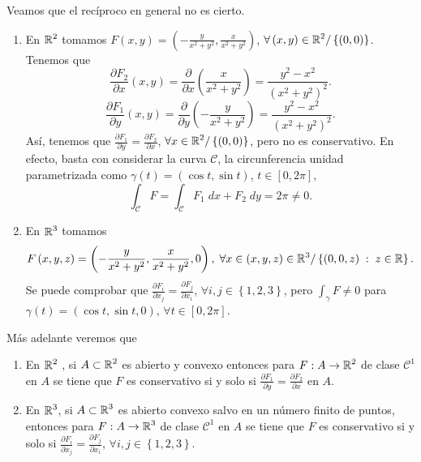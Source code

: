 \begin{eg}
Veamos que el recíproco en general no es cierto.
\begin{enumerate}
	\item En $\displaystyle \mathbb{R}^{2} $ tomamos $\displaystyle F\left(x,y\right)=\left(-\frac{y}{x^{2}+y^{2}}, \frac{x}{x^{2}+y^{2}}\right) $, $\displaystyle \forall \left(x,y\right)\in \mathbb{R}^{2} / \left\{ \left(0,0\right)\right\}  $. Tenemos que 
		\[\frac{\partial F_{2}}{\partial x}\left(x,y\right)=\frac{\partial }{\partial x}\left(\frac{x}{x^{2}+y^{2}}\right)=\frac{y^{2}-x^{2}}{\left(x^{2}+y^{2}\right)^{2}}  .\]
		\[\frac{\partial F_{1}}{\partial y}\left(x,y\right)=
		\frac{\partial }{\partial y}\left(-\frac{y}{x^{2}+y^{2}}\right)=\frac{y^{2}-x^{2}}{\left(x^{2}+y^{2}\right)^{2}} .\]
		Así, tenemos que $\displaystyle \frac{\partial F_{1}}{\partial y}=\frac{\partial F_{2}}{\partial x} $, $\displaystyle \forall x \in \mathbb{R}^{2}/ \left\{ \left(0,0\right)\right\}  $, pero no es conservativo. En efecto, basta con considerar la curva $\displaystyle \mathcal{C} $, la circunferencia unidad parametrizada como $\displaystyle \gamma\left(t\right)=\left(\cos t, \sin t\right) $, $\displaystyle t \in \left[0,2\pi \right]  $, 
		\[\int _{\mathcal{C}}F = \int _{\mathcal{C}}F_{1} \; dx + F_{2} \; dy = 2\pi \neq 0 .\]
	\item En $\displaystyle \mathbb{R}^{3} $ tomamos
		\[F\left(x,y,z\right)=\left(-\frac{y}{x^{2}+y^{2}}, \frac{x}{x^{2}+y^{2}}, 0\right), \; \forall x \in \left(x,y,z\right)\in \mathbb{R}^{3}/ \left\{ \left(0,0,z\right)\; : \; z \in \mathbb{R}\right\}  .\]
		Se puede comprobar que $\displaystyle \frac{\partial F_{i}}{\partial x_{j}}=\frac{\partial F_{j}}{\partial x_{i}} $, $\displaystyle \forall i,j \in \left\{ 1,2,3\right\}  $, pero $\displaystyle \int _{\gamma }F \neq 0 $ para $\displaystyle \gamma\left(t\right)=\left(\cos t, \sin t, 0\right) $, $\displaystyle \forall t \in \left[0,2\pi \right]  $. 
\end{enumerate}
\end{eg}
\begin{observation}
Más adelante veremos que 
\begin{enumerate}
\item En $\displaystyle \mathbb{R}^{2} $ , si $\displaystyle A\subset \mathbb{R}^{2} $ es abierto y convexo entonces para $\displaystyle F : A \to \mathbb{R}^{2} $ de clase $\displaystyle \mathcal{C}^{1} $ en $\displaystyle A $ se tiene que $\displaystyle F $ es conservativo si y solo si $\displaystyle \frac{\partial F_{1}}{\partial y}=\frac{\partial F_{2}}{\partial x} $ en $\displaystyle A $. 
\item En $\displaystyle \mathbb{R}^{3} $, si $\displaystyle A \subset \mathbb{R}^{3} $ es abierto convexo salvo en un número finito de puntos, entonces para $\displaystyle F : A \to \mathbb{R}^{3} $ de clase $\displaystyle \mathcal{C}^{1} $ en $\displaystyle A $ se tiene que $\displaystyle F $ es conservativo si y solo si $\displaystyle \frac{ \partial F_{i}}{\partial x_{j}}=\frac{\partial F_{j}}{\partial x_{i}} $, $\displaystyle \forall i,j \in \left\{ 1,2,3\right\}  $. 
\end{enumerate}
\end{observation}

